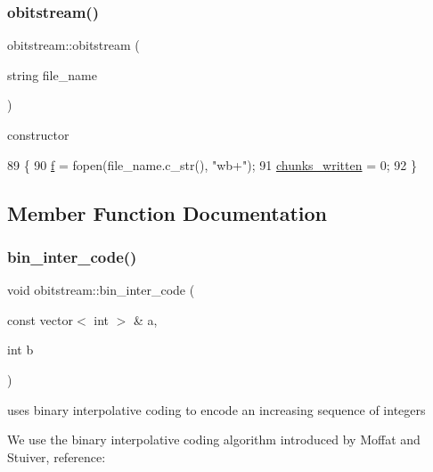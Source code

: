 \subsubsection{\texorpdfstring{obitstream()}{obitstream()}}
{\footnotesize\ttfamily obitstream\+::obitstream (\begin{DoxyParamCaption}\item[{string}]{file\+\_\+name }\end{DoxyParamCaption})\hspace{0.3cm}{\ttfamily [inline]}}



constructor 


\begin{DoxyCode}
89                               \{
90     \hyperlink{classobitstream_ac589d74745217748c888ae777ab324a7}{f} = fopen(file\_name.c\_str(), \textcolor{stringliteral}{"wb+"});
91     \hyperlink{classobitstream_a3022397f2b6133ea5990016d9d078a2f}{chunks\_written} = 0;
92   \}
\end{DoxyCode}


\subsection{Member Function Documentation}
\mbox{\label{classobitstream_a945c237be04936240953ba927486cde1}} 
\subsubsection{\texorpdfstring{bin\+\_\+inter\+\_\+code()}{bin\_inter\_code()}\hspace{0.1cm}{\footnotesize\ttfamily [1/2]}}
{\footnotesize\ttfamily void obitstream\+::bin\+\_\+inter\+\_\+code (\begin{DoxyParamCaption}\item[{const vector$<$ int $>$ \&}]{a,  }\item[{int}]{b }\end{DoxyParamCaption})}



uses binary interpolative coding to encode an increasing sequence of integers 

We use the binary interpolative coding algorithm introduced by Moffat and Stuiver, reference\+:

